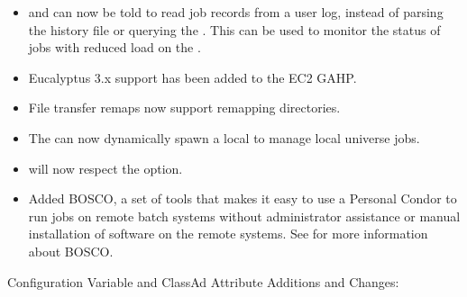 \begin{itemize}
\item {} and  can now be told to read job records
from a user log, instead of parsing the history file or querying the
.  This can be used to monitor the status of jobs with
reduced load on the .

\item Eucalyptus 3.x support has been added to the EC2 GAHP.

\item File transfer remaps now support remapping directories.

\item The  can now dynamically spawn a local 
to manage local universe jobs.

\item {}  will now respect the  option.

\item Added BOSCO, a set of tools that makes it easy to use a Personal
Condor to run jobs on remote batch systems without administrator
assistance or manual installation of software on the remote systems.
See  for more
information about BOSCO.

\end{itemize}


\noindent Configuration Variable and ClassAd Attribute Additions and Changes:

